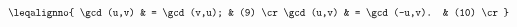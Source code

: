 $$
\leqalignno{
\gcd(u,v) & = \gcd(v,u); & (9) \cr
\gcd(u,v) & = \gcd(-u,v). & (10) \cr
}
$$


\bye


